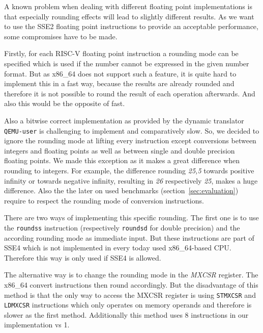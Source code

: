\documentclass[course=eragp]{aspdoc}
\begin{document}
A known problem when dealing with different floating point implementations is that especially
rounding effects will lead to slightly different results. As we want to use the SSE2 floating point
instructions to provide an acceptable performance, some compromises have to be made.

\par

Firstly, for each RISC-V floating point instruction a rounding mode can be specified which is used
if the number cannot be expressed in the given number format. But as x86\_64 does not support such a
feature, it is quite hard to implement this in a fast way, because the results are already rounded
and therefore it is not possible to round the result of each operation afterwards. And also this
would be the opposite of fast.

\par

Also a bitwise correct implementation as provided by the dynamic translator \texttt{QEMU-user} is
challenging to implement and comparatively slow. So, we decided to ignore the rounding mode at lifting
every instruction except conversions between integers and floating points as well as between single
and double precision floating points. We made this exception as it makes a great difference when
rounding to integers. For example, the difference rounding \emph{25,5} towards positive infinity or
towards negative infinity, resulting in \emph{26} respectively \emph{25}, makes a huge difference.
Also the the later on used benchmarks (section~\ref{sec:evaluation}) require to respect the rounding mode of
conversion instructions.

\par

There are two ways of implementing this specific rounding. The first one is to use the \texttt{roundss}
instruction (respectively \texttt{roundsd} for double precision) and the according rounding mode as
immediate input. But these instructions are part of SSE4 which is not implemented in every today used
x86\_64-based CPU.~\cite{intel2017man} Therefore this way is only used if SSE4 is allowed.

\par

The alternative way is to change the rounding mode in the \emph{MXCSR} register. The x86\_64 convert
instructions then round accordingly. But the disadvantage of this method is that the only way to
access the MXCSR register is using \texttt{STMXCSR} and \texttt{LDMXCSR} instructions which only operates on
memory operands and therefore is slower as the first method. Additionally this method uses 8
instructions in our implementation vs 1.~\cite{intel2017man}
\end{document}

